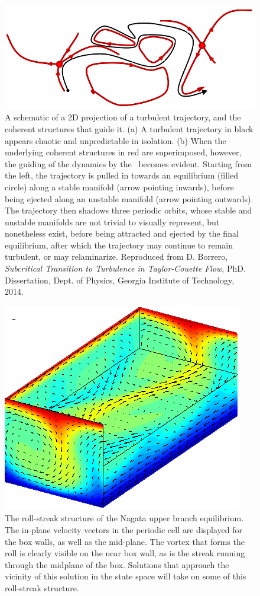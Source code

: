 \begin{figure}[h]
\centerline{
\includegraphics[width=\textwidth]{Figs/phaseSpaceTraj.pdf}}
\caption{A schematic of a 2D projection of a turbulent trajectory, and the coherent structures that guide it. (a) A turbulent trajectory in black appears chaotic and unpredictable in isolation. (b) When the underlying coherent structures in red are superimposed, however, the guiding of the dynamics by the \ecs\ becomes evident. Starting from the left, the trajectory is pulled in towards an equilibrium (filled circle) along a stable manifold (arrow pointing inwards), before being ejected along an unstable manifold (arrow pointing outwards). The trajectory then shadows three periodic orbits, whose stable and unstable manifolds are not trivial to visually represent, but nonetheless exist, before being attracted and ejected by the final equilibrium, after which the trajectory may continue to remain turbulent, or may relaminarize. Reproduced from D. Borrero, \emph{Subcritical Transition to Turbulence in Taylor-Couette Flow}, PhD. Dissertation, Dept. of Physics, Georgia Institute of Technology, 2014.}\label{fig:guidedTurbulence}
\end{figure}

\begin{figure}[t]
\centerline{\includegraphics[scale=0.5]{Figs/rollStreak}}
\caption{The roll-streak structure of the Nagata upper branch equilibrium. The in-plane velocity vectors in the periodic cell are displayed for the box walls, as well as the mid-plane. The vortex that forms the roll is clearly visible on the near box wall, as is the streak running through the midplane of the box. Solutions that approach the vicinity of this solution in the state space will take on some of this roll-streak structure.}\label{fig:rollstreak}
\end{figure}


